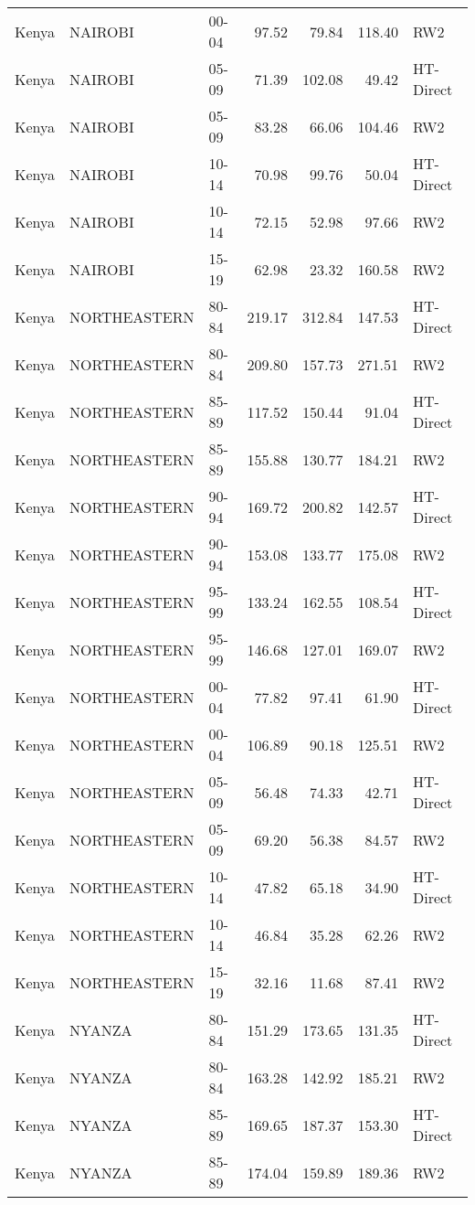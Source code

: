 \begin{longtable}{lllrrrl}
  Kenya & NAIROBI & 00-04 & 97.52 & 79.84 & 118.40 & RW2 \\ 
  Kenya & NAIROBI & 05-09 & 71.39 & 102.08 & 49.42 & HT-Direct \\ 
  Kenya & NAIROBI & 05-09 & 83.28 & 66.06 & 104.46 & RW2 \\ 
  Kenya & NAIROBI & 10-14 & 70.98 & 99.76 & 50.04 & HT-Direct \\ 
  Kenya & NAIROBI & 10-14 & 72.15 & 52.98 & 97.66 & RW2 \\ 
  Kenya & NAIROBI & 15-19 & 62.98 & 23.32 & 160.58 & RW2 \\ 
  Kenya & NORTHEASTERN & 80-84 & 219.17 & 312.84 & 147.53 & HT-Direct \\ 
  Kenya & NORTHEASTERN & 80-84 & 209.80 & 157.73 & 271.51 & RW2 \\ 
  Kenya & NORTHEASTERN & 85-89 & 117.52 & 150.44 & 91.04 & HT-Direct \\ 
  Kenya & NORTHEASTERN & 85-89 & 155.88 & 130.77 & 184.21 & RW2 \\ 
  Kenya & NORTHEASTERN & 90-94 & 169.72 & 200.82 & 142.57 & HT-Direct \\ 
  Kenya & NORTHEASTERN & 90-94 & 153.08 & 133.77 & 175.08 & RW2 \\ 
  Kenya & NORTHEASTERN & 95-99 & 133.24 & 162.55 & 108.54 & HT-Direct \\ 
  Kenya & NORTHEASTERN & 95-99 & 146.68 & 127.01 & 169.07 & RW2 \\ 
  Kenya & NORTHEASTERN & 00-04 & 77.82 & 97.41 & 61.90 & HT-Direct \\ 
  Kenya & NORTHEASTERN & 00-04 & 106.89 & 90.18 & 125.51 & RW2 \\ 
  Kenya & NORTHEASTERN & 05-09 & 56.48 & 74.33 & 42.71 & HT-Direct \\ 
  Kenya & NORTHEASTERN & 05-09 & 69.20 & 56.38 & 84.57 & RW2 \\ 
  Kenya & NORTHEASTERN & 10-14 & 47.82 & 65.18 & 34.90 & HT-Direct \\ 
  Kenya & NORTHEASTERN & 10-14 & 46.84 & 35.28 & 62.26 & RW2 \\ 
  Kenya & NORTHEASTERN & 15-19 & 32.16 & 11.68 & 87.41 & RW2 \\ 
  Kenya & NYANZA & 80-84 & 151.29 & 173.65 & 131.35 & HT-Direct \\ 
  Kenya & NYANZA & 80-84 & 163.28 & 142.92 & 185.21 & RW2 \\ 
  Kenya & NYANZA & 85-89 & 169.65 & 187.37 & 153.30 & HT-Direct \\ 
  Kenya & NYANZA & 85-89 & 174.04 & 159.89 & 189.36 & RW2 \\ 

\end{longtable}
